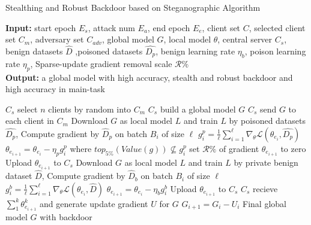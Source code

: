 \documentclass{article}
\begin{document}
\begin{algorithm}[t]
	\caption{Stealthing and Robust Backdoor based on Steganographic Algorithm} %
	\hspace*{0.02in} {\bf Input:} %
	{start epoch $E_s$, attack num $E_a$, end epoch $E_e$, client set $C$, selected client set $C_m$, adversary set $C_{adv}$, global model $G$, local model $\theta$, central server $C_s$, benign datasets $\hat{D}$ ,poisoned datasets $\hat{D_p}$, benign learning rate $\eta_b$, poison learning rate $\eta_p$, Sparse-update gradient removal scale $ \mathcal{R\%} $}\\
	\hspace*{0.02in} {\bf Output:} %
	a global model with high accuracy, stealth and robust backdoor and high accuracy in main-task


	\begin{algorithmic}[1]

	\State $C_s$ select $n$ clients by random into $C_m$ %
	\State $C_s$ build a global model $G$
	\State $C_s$ send $G$ to each client in $C_m$
				\State Download $G$ as local model $L$ and train $L$ by poisoned datasets $\hat{D_p}$, 
				\State Compute gradient by $\hat{D}_p$ on batch $B_i$ of size $\ell$
				\State $ g_i^p = \frac{1}{\ell}\sum_{i = 1}^{\ell}\nabla_\theta \mathcal{L}(\theta_{e_i}, \hat{D_p}) $
				\State $ \theta_{e_{i+1}} = \theta_{e_i} - \eta_p g_i^p $ where $ top_{5\%}(Value(g)) \not\subseteq g_i^p $
				\State set $ \mathcal{R\%} $ of gradient $ \theta_{e_{i+1}}$ to zero
				\State Upload $ \theta_{e_{i+1}}$ to $C_s $
				\State Download $G$ as local model $L$ and train $L$ by private benign dataset $\hat{D}$, 
				\State Compute gradient by $\hat{D}_b$ on batch $B_i$ of size $\ell$
				\State $ g_i^b = \frac{1}{\ell}\sum_{i = 1}^{\ell}\nabla_\theta \mathcal{L}(\theta_{e_i}, \hat{D}) $
				\State $ \theta_{e_{i+1}} = \theta_{e_i} - \eta_b g_i^b $
				\State Upload $ \theta_{e_{i+1}}$ to $C_s $
			\EndIf
			\State $C_s$ recieve $ \sum_1^k \theta_{e_{i+1}}^k$ and generate update gradient $U$ for $G$
			\State $G_{i+1} = G_i - U_i$
		\EndFor
	\EndFor
\State \Return Final global model $G$ with backdoor

	\end{algorithmic}
	

\end{algorithm}
\end{document}
